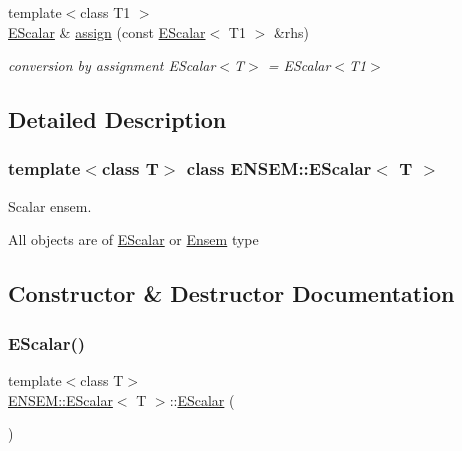 \begin{DoxyCompactItemize}
{\footnotesize template$<$class T1 $>$ }\\\mbox{\hyperlink{classENSEM_1_1EScalar}{E\+Scalar}} \& \mbox{\hyperlink{classENSEM_1_1EScalar_aa9a54e03830d13eb6a124c64c6a46dd1}{assign}} (const \mbox{\hyperlink{classENSEM_1_1EScalar}{E\+Scalar}}$<$ T1 $>$ \&rhs)
\begin{DoxyCompactList}\small\item\em conversion by assignment E\+Scalar$<$\+T$>$ = E\+Scalar$<$\+T1$>$ \end{DoxyCompactList}\end{DoxyCompactItemize}


\subsection{Detailed Description}
\subsubsection*{template$<$class T$>$\newline
class E\+N\+S\+E\+M\+::\+E\+Scalar$<$ T $>$}

Scalar ensem. 

All objects are of \mbox{\hyperlink{classENSEM_1_1EScalar}{E\+Scalar}} or \mbox{\hyperlink{classENSEM_1_1Ensem}{Ensem}} type 

\subsection{Constructor \& Destructor Documentation}
\mbox{\label{classENSEM_1_1EScalar_ad4290141b2f7d43b6652d8ef95dfdbf5}} 
\subsubsection{\texorpdfstring{EScalar()}{EScalar()}\hspace{0.1cm}{\footnotesize\ttfamily [1/12]}}
{\footnotesize\ttfamily template$<$class T$>$ \\
\mbox{\hyperlink{classENSEM_1_1EScalar}{E\+N\+S\+E\+M\+::\+E\+Scalar}}$<$ T $>$\+::\mbox{\hyperlink{classENSEM_1_1EScalar}{E\+Scalar}} (\begin{DoxyParamCaption}{ }\end{DoxyParamCaption})\hspace{0.3cm}{\ttfamily [inline]}}

